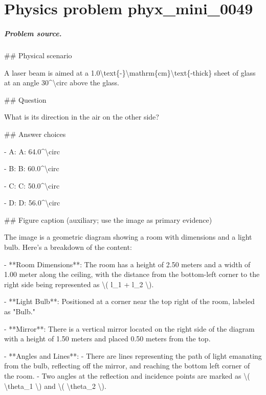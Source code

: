 
\chapter{Physics problem phyx\_mini\_0049}
\label{ch:PhyXMiniProblems_problem_phyx_mini_0049}

\paragraph{Problem source.}
\#\# Physical scenario

A laser beam is aimed at a 1.0\textbackslash{}text\{-\}\textbackslash{}mathrm\{cm\}\textbackslash{}text\{-thick\} sheet of glass at an angle 30\textasciicircum{}\textbackslash{}circ above the glass.

\#\# Question

What is its direction in the air on the other side?

\#\# Answer choices

- A: A: 64.0\textasciicircum{}\textbackslash{}circ

- B: B: 60.0\textasciicircum{}\textbackslash{}circ

- C: C: 50.0\textasciicircum{}\textbackslash{}circ

- D: D: 56.0\textasciicircum{}\textbackslash{}circ

\#\# Figure caption (auxiliary; use the image as primary evidence)

The image is a geometric diagram showing a room with dimensions and a light bulb. Here's a breakdown of the content:

- **Room Dimensions**: The room has a height of 2.50 meters and a width of 1.00 meter along the ceiling, with the distance from the bottom-left corner to the right side being represented as \textbackslash{}( l\_1 + l\_2 \textbackslash{}).

- **Light Bulb**: Positioned at a corner near the top right of the room, labeled as "Bulb."

- **Mirror**: There is a vertical mirror located on the right side of the diagram with a height of 1.50 meters and placed 0.50 meters from the top.

- **Angles and Lines**:
  - There are lines representing the path of light emanating from the bulb, reflecting off the mirror, and reaching the bottom left corner of the room.
  - Two angles at the reflection and incidence points are marked as \textbackslash{}( \textbackslash{}theta\_1 \textbackslash{}) and \textbackslash{}( \textbackslash{}theta\_2 \textbackslash{}).

